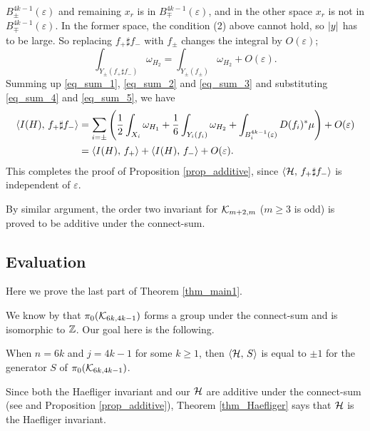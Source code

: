 $B^{4k-1}_{\pm}(\varepsilon )$ and remaining $x_r$ is in $B^{4k-1}_{\mp}(\varepsilon )$, and in the other space $x_r$
is not in $B^{4k-1}_{\mp} (\varepsilon )$.
In the former space, the condition (2) above cannot hold, so $\lvert {y} \rvert$ has to be large.
So replacing $f_+ \sharp f_-$ with $f_{\pm}$ changes the integral by $O(\varepsilon )$;
\begin{equation}\label{eq_sum_5}
 \int_{Y_{\pm}(f_+ \sharp f_- )}\omega_{H_2} = \int_{Y_{\pm}(f_{\pm})}\omega_{H_2} + O(\varepsilon ).
\end{equation}
Summing up \eqref{eq_sum_1}, \eqref{eq_sum_2} and \eqref{eq_sum_3} and substituting \eqref{eq_sum_4} and
\eqref{eq_sum_5}, we have
\begin{align*}
 \langle {I(H)},\, {f_+ \sharp f_-}\rangle
  &= \sum_{i=\pm} \left(\frac{1}{2}\int_{X_i}\omega_{H_1} + \frac{1}{6}\int_{Y_i (f_i )}\omega_{H_2}
   + \int_{B^{4k-1}_i (\varepsilon)}D(f_i )^* \mu  \right) + O(\varepsilon ) \\
 &= \langle {I(H)},\, {f_+}\rangle + \langle {I(H)},\, {f_-}\rangle + O(\varepsilon ).
\end{align*}
This completes the proof of Proposition \ref{prop_additive}, since $\langle {\mathcal{H}},\, {f_+ \sharp f_-}\rangle$ is independent of
$\varepsilon$.


\begin{rem}
By similar argument, the order two invariant \cite{Rossi_thesis, Watanabe07} for $\mathcal{K}_{m+2 ,m}$ ($m \ge 3$ is odd) is
proved to be additive under the connect-sum.
\end{rem}





\subsection{Evaluation}\label{subsec_evaluation}
Here we prove the last part of Theorem \ref{thm_main1}.


We know by \cite{Haefliger66} that $\pi_0 (\mathcal{K}_{6k ,4k-1})$ forms a group under the connect-sum and is isomorphic to
$\mathbb{Z}$.
Our goal here is the following.

\begin{thm}\label{thm_Haefliger}
When $n=6k$ and $j=4k-1$ for some $k \ge 1$, then $\langle {\mathcal{H}},\, {S}\rangle$ is equal to $\pm 1$ for the generator $S$ of
$\pi_0 (\mathcal{K}_{6k ,4k-1})$.
\end{thm}


Since both the Haefliger invariant and our $\mathcal{H}$ are additive under the connect-sum (see \cite{Haefliger62} and
Proposition \ref{prop_additive}), Theorem \ref{thm_Haefliger} says that $\mathcal{H}$ is the Haefliger invariant.


